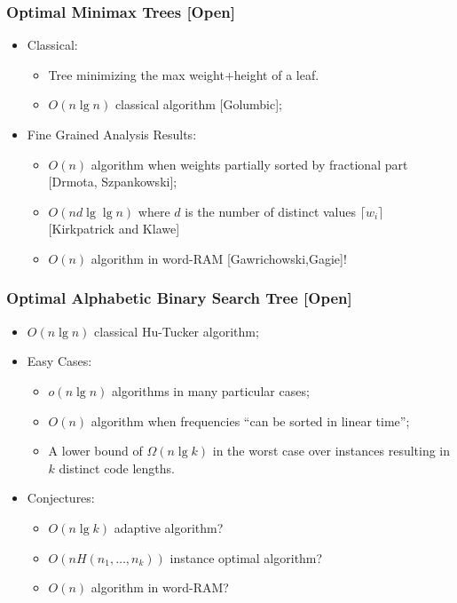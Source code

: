 \begin{frame}
  \frametitle{Optimal Minimax Trees [Open]}
  \begin{itemize}
\item Classical:
  \begin{itemize}
  \item Tree minimizing the max weight+height of a leaf.
  \item $O(n\lg n)$ classical algorithm [Golumbic];
    \end{itemize}
  \item Fine Grained Analysis Results:
  \begin{itemize}
  \item $O(n)$ algorithm when weights partially sorted by fractional part [Drmota, Szpankowski];
  \item $O(nd\lg\lg n)$ where $d$ is the number of distinct values
    $\lceil w_i\rceil$ [Kirkpatrick and Klawe]
  \item $O(n)$ algorithm in word-RAM [Gawrichowski,Gagie]!
    \end{itemize}
    \end{itemize}
\end{frame}

\begin{frame}
  \frametitle{Optimal Alphabetic Binary Search Tree [Open]}
  \begin{itemize}
  \item $O(n\lg n)$ classical \alert{Hu-Tucker} algorithm;
  \item Easy Cases:
  \begin{itemize}
  \item $o(n\lg n)$ algorithms in many particular cases;
  \item $O(n)$ algorithm when frequencies ``can be sorted in linear time'';
  \item A lower bound of $\Omega(n\lg k)$ in the worst case over
    instances resulting in $k$ distinct code lengths.
    \end{itemize}
  \item Conjectures:
  \begin{itemize}
  \item $O(n\lg k)$ adaptive algorithm?
  \item $O(nH(n_1,\ldots,n_k))$ instance optimal algorithm?
  \item \alert{$O(n)$ algorithm in word-RAM}?
  \end{itemize}

    \end{itemize}
\end{frame}

